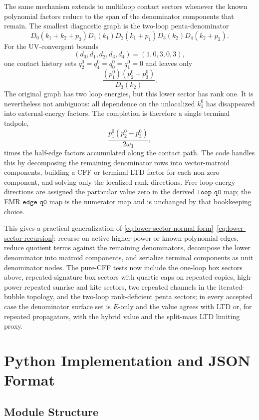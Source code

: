 \documentclass[11pt,a4paper]{report}
\begin{document}
The same mechanism extends to multiloop contact sectors whenever the known
polynomial factors reduce to the span of the denominator components that remain.
The smallest diagnostic graph is the two-loop penta-denominator
\[
  D_0(k_1+k_2+p_3)D_1(k_1)D_2(k_1+p_1)D_3(k_2)D_4(k_2+p_2).
\]
For the UV-convergent bounds
\[
  (d_0,d_1,d_2,d_3,d_4)=(1,0,3,0,3),
\]
one contact history sets \(q_2^0=q_4^0=q_0^0=q_1^0=0\) and leaves only
\[
  \frac{(p_1^0)(p_2^0-p_3^0)}{D_3(k_2)} .
\]
The original graph has two loop energies, but this lower sector has rank one.
It is nevertheless not ambiguous: all dependence on the unlocalized \(k_1^0\)
has disappeared into external-energy factors.  The completion is therefore a
single terminal tadpole,
\[
  \frac{p_1^0(p_2^0-p_3^0)}{2\omega_3},
\]
times the half-edge factors accumulated along the contact path.  The code
handles this by decomposing the remaining denominator rows into vector-matroid
components, building a CFF or terminal LTD factor for each non-zero component,
and solving only the localized rank directions.  Free loop-energy directions
are assigned the particular value zero in the derived \(\texttt{loop\_q0}\)
map; the EMR \(\texttt{edge\_q0}\) map is the numerator map and is unchanged by
that bookkeeping choice.

This gives a practical generalization of
\eqref{eq:lower-sector-normal-form}--\eqref{eq:lower-sector-recursion}: recurse
on active higher-power or known-polynomial edges, reduce quotient terms against
the remaining denominators, decompose the lower denominator into matroid
components, and serialize terminal components as unit denominator nodes.  The
pure-CFF tests now include the one-loop box sectors above, repeated-signature
box sectors with quartic caps on repeated copies, high-power repeated sunrise
and kite sectors, two repeated channels in the iterated-bubble topology, and
the two-loop rank-deficient penta sectors; in every accepted case the
denominator surface set is \(E\)-only and the value agrees with LTD or, for
repeated propagators, with the hybrid value and the split-mass LTD limiting
proxy.

\chapter{Python Implementation and JSON Format}

\section{Module Structure}
\end{document}
